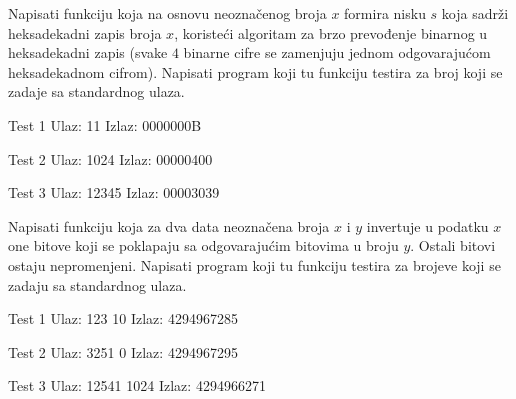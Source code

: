 \begin{Exercise}[label=210]
  Napisati funkciju koja na osnovu neoznačenog broja $x$
  formira nisku $s$ koja sadrži heksadekadni zapis broja
  $x$, koristeći algoritam za brzo prevođenje binarnog u
  heksadekadni zapis (svake $4$ binarne cifre se zamenjuju jednom
  odgovarajućom heksadekadnom cifrom).  Napisati program koji tu
  funkciju testira za broj koji se zadaje sa standardnog ulaza.

\begin{minitest}
\begin{test}{Test 1}
Ulaz:   11             
Izlaz:  0000000B      
\end{test}
\end{minitest}
\begin{minitest}
\begin{test}{Test 2}
Ulaz:  1024        
Izlaz: 00000400  
\end{test}
\end{minitest}
\begin{minitest}
\begin{test}{Test 3}
Ulaz:  12345
Izlaz: 00003039
\end{test}
\end{minitest}
\end{Exercise}
\begin{Answer}[ref=210]
\end{Answer}


\begin{Exercise}[label=211]
  Napisati funkciju koja za dva data neoznačena broja $x$
  i $y$ invertuje u podatku $x$ one bitove koji se poklapaju
  sa odgovarajućim bitovima u broju $y$. Ostali bitovi ostaju
  nepromenjeni.  Napisati program koji tu funkciju testira za brojeve
  koji se zadaju sa standardnog ulaza.
  
\begin{minitest}
\begin{test}{Test 1}
Ulaz:   123 10        
Izlaz:  4294967285    
\end{test}
\end{minitest}
\begin{minitest}
\begin{test}{Test 2}
Ulaz:  3251 0    
Izlaz: 4294967295    
\end{test}
\end{minitest}
\begin{minitest}
\begin{test}{Test 3}
Ulaz:   12541 1024
Izlaz:  4294966271
\end{test}
\end{minitest}
\end{Exercise}
\begin{Answer}[ref=211]
\end{Answer}

